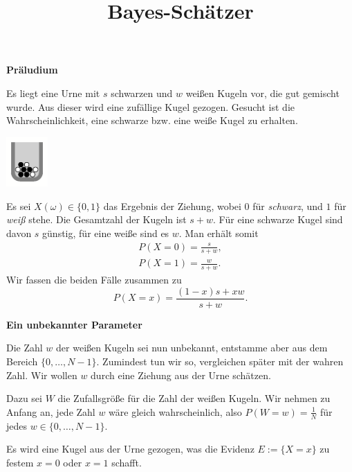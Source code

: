 \documentclass[8pt]{beamer}
\title{Bayes-Schätzer}
\date{}
\newcommand{\strong}[1]{\textsf{\textbf{#1}}}
\newcommand{\parspace}{\vspace{0.8em}}
\newcommand{\centerheadline}[1]{%
  \begin{center}\strong{#1}\end{center}}
\begin{document}
\begin{frame}
\maketitle
\end{frame}

\begin{frame}
\centerheadline{Präludium}
\end{frame}

\begin{frame}

\begin{minipage}{0.70\textwidth}
Es liegt eine Urne mit $s$ schwarzen und $w$ weißen Kugeln vor, die
gut gemischt wurde. Aus dieser wird eine zufällige Kugel gezogen.
Gesucht ist die Wahrscheinlichkeit, eine schwarze bzw. eine weiße Kugel
zu erhalten.
\end{minipage}
\qquad
\begin{minipage}{0.20\textwidth}
\includegraphics[width=16mm]{img/Urne.pdf}
\end{minipage}\pause

\parspace
Es sei $X(\omega)\in\{0,1\}$ das Ergebnis der Ziehung, wobei $0$ für
\emph{schwarz}, und $1$ für \emph{weiß} stehe. Die Gesamtzahl
der Kugeln ist $s+w$. Für eine schwarze Kugel sind davon $s$ günstig,
für eine weiße sind es $w$. Man erhält somit
\begin{align*}
P(X=0) = \frac{s}{s+w},\\
P(X=1) = \frac{w}{s+w}.
\end{align*}\pause
Wir fassen die beiden Fälle zusammen zu
\[P(X=x) = \frac{(1-x)s+xw}{s+w}.\]
\end{frame}

\begin{frame}
\centerheadline{Ein unbekannter Parameter}
\end{frame}

\begin{frame}
Die Zahl $w$ der weißen Kugeln sei nun unbekannt, entstamme aber aus
dem Bereich $\{0,\ldots,N-1\}$. Zumindest tun wir so, vergleichen
später mit der wahren Zahl. Wir wollen $w$ durch eine Ziehung aus der
Urne schätzen.\pause

\parspace
Dazu sei $W$ die Zufallsgröße für die Zahl der weißen Kugeln.
Wir nehmen zu Anfang an, jede Zahl $w$ wäre gleich wahrscheinlich, also
$P(W=w)=\frac{1}{N}$ für jedes $w\in\{0,\ldots,N-1\}$.\pause

\parspace
Es wird eine Kugel aus der Urne gezogen, was die Evidenz $E:=\{X=x\}$
zu festem $x=0$ oder $x=1$ schafft.
\end{frame}
\end{document}
